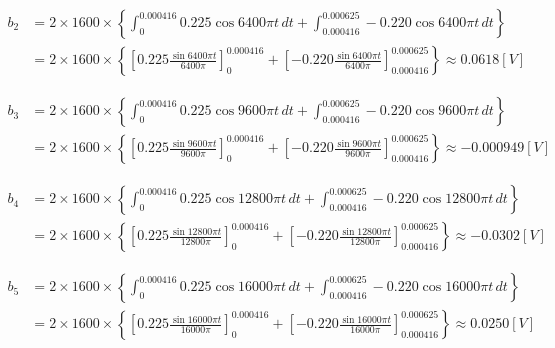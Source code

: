 \begin{screen}
  \begin{equation}
    \begin{aligned}
      b_2 &= 2\times1600\times\left\{ \int_{0}^{0.000416}0.225\cos 6400\pi t \,dt+ \int_{0.000416}^{0.000625}-0.220\cos 6400\pi t \,dt \right\}\\
      &= 2\times1600\times\left\{ \left[0.225\frac{\sin6400\pi t}{6400\pi}\right]^{0.000416}_0+ \left[-0.220\frac{\sin 6400\pi t}{6400\pi}\right]^{0.000625}_{0.000416} \right\} \approx 0.0618 \si{[V]} \label{eq10}
    \end{aligned}
  \end{equation}
\end{screen}

\begin{screen}
  \begin{equation}
    \begin{aligned}
      b_3 &= 2\times1600\times\left\{ \int_{0}^{0.000416}0.225\cos 9600\pi t \,dt+ \int_{0.000416}^{0.000625}-0.220\cos 9600\pi t \,dt \right\}\\
      &= 2\times1600\times\left\{ \left[0.225\frac{\sin9600\pi t}{9600\pi}\right]^{0.000416}_0+ \left[-0.220\frac{\sin 9600\pi t}{9600\pi}\right]^{0.000625}_{0.000416} \right\} \approx -0.000949 \si{[V]} \label{eq11}
    \end{aligned}
  \end{equation}
\end{screen}

\begin{screen}
  \begin{equation}
    \begin{aligned}
      b_4 &= 2\times1600\times\left\{ \int_{0}^{0.000416}0.225\cos 12800\pi t \,dt+ \int_{0.000416}^{0.000625}-0.220\cos 12800\pi t \,dt \right\}\\
      &= 2\times1600\times\left\{ \left[0.225\frac{\sin12800\pi t}{12800\pi}\right]^{0.000416}_0+ \left[-0.220\frac{\sin 12800\pi t}{12800\pi}\right]^{0.000625}_{0.000416} \right\} \approx -0.0302 \si{[V]} \label{eq12}
    \end{aligned}
  \end{equation}
\end{screen}

\begin{screen}
  \begin{equation}
    \begin{aligned}
      b_5 &= 2\times1600\times\left\{ \int_{0}^{0.000416}0.225\cos 16000\pi t \,dt+ \int_{0.000416}^{0.000625}-0.220\cos 16000\pi t \,dt \right\}\\
      &= 2\times1600\times\left\{ \left[0.225\frac{\sin16000\pi t}{16000\pi}\right]^{0.000416}_0+ \left[-0.220\frac{\sin 16000\pi t}{16000\pi}\right]^{0.000625}_{0.000416} \right\} \approx 0.0250 \si{[V]} \label{eq13}
    \end{aligned}
  \end{equation}
\end{screen}

